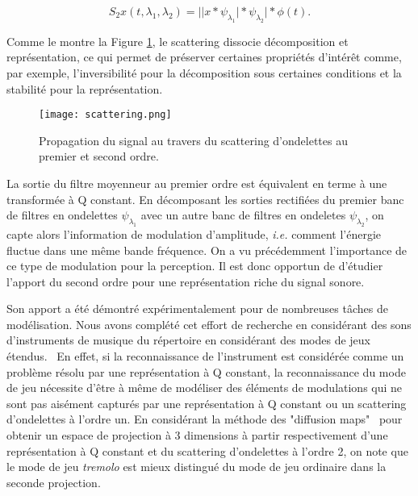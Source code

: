 \begin{equation}
S_2{x}(t, \lambda_1, \lambda_2)
= \vert \vert {x} \ast {\psi_{\lambda_1}} \vert \ast {\psi_{\lambda_2}} \vert \ast \phi(t)\mbox{.}
\end{equation}

Comme le montre la Figure \ref{fig:scat}, le scattering dissocie décomposition et représentation, ce qui permet de préserver certaines propriétés d'intérêt comme, par exemple, l'inversibilité pour la décomposition sous certaines conditions et la stabilité pour la représentation.

\begin{figure}[t]
  \texttt{[image: scattering.png]}
  \caption{Propagation du signal au travers du scattering d'ondelettes au premier et second ordre.}
  \label{fig:scat}
\end{figure}

La sortie du filtre moyenneur au premier ordre est équivalent en terme à une transformée à Q constant. En décomposant les sorties rectifiées du premier banc de filtres en ondelettes $\psi_{\lambda_1}$ avec un autre banc de filtres en ondeletes $\psi_{\lambda_2}$, on capte alors l'information de modulation d'amplitude, \textit{i.e.} comment l'énergie fluctue dans une même bande fréquence. On a vu précédemment l'importance de ce type de modulation pour la perception. Il est donc opportun de d'étudier l'apport du second ordre pour une représentation riche du signal sonore.  %




Son apport a été démontré expérimentalement pour de nombreuses tâches de modélisation. Nous avons complété cet effort de recherche en considérant des sons d'instruments de musique du répertoire en considérant des modes de jeux étendus.~\cite{lostanlen2018extended} En effet, si la reconnaissance de l'instrument est considérée comme un problème résolu par une représentation à Q constant, la reconnaissance du mode de jeu nécessite d'être à même de modéliser des éléments de modulations qui ne sont pas aisément capturés par une représentation à Q constant ou un scattering d'ondelettes à l'ordre un. En considérant la méthode des "diffusion maps"~\cite{coifman2005geometric} pour obtenir un espace de projection à 3 dimensions à partir respectivement d'une représentation à Q constant et du scattering d'ondelettes à l'ordre 2, on note que le mode de jeu \textsl{tremolo} est mieux distingué du mode de jeu ordinaire dans la seconde projection.

